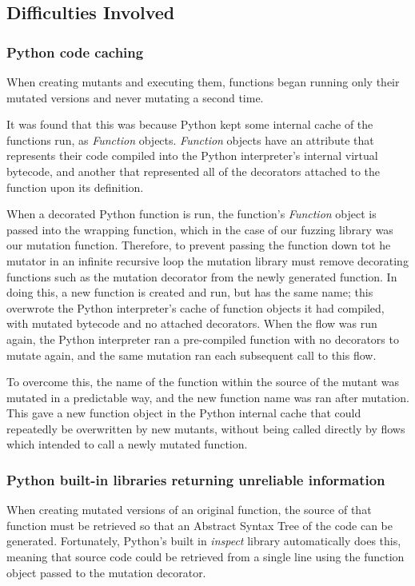 {\subsection{Difficulties Involved}
\subsubsection{Python code caching}
When creating mutants and executing them, functions began running only their mutated versions and never mutating a second time. \par

It was found that this was because Python kept some internal cache of the functions run, as \emph{Function} objects. \emph{Function} objects have an attribute that represents their code compiled into the Python interpreter's internal virtual bytecode, and another that represented all of the decorators attached to the function upon its definition. \par

When a decorated Python function is run, the function's \emph{Function} object is passed into the wrapping function, which in the case of our fuzzing library was our mutation function. Therefore, to prevent passing the function down tot he mutator in an infinite recursive loop the mutation library must remove decorating functions such as the mutation decorator from the newly generated function. In doing this, a new function is created and run, but has the same name; this overwrote the Python interpreter's cache of function objects it had compiled, with mutated bytecode and no attached decorators. When the flow was run again, the Python interpreter ran a pre-compiled function with no decorators to mutate again, and the same mutation ran each subsequent call to this flow. \par

To overcome this, the name of the function within the source of the mutant was mutated in a predictable way, and the new function name was ran after mutation. This gave a new function object in the Python internal cache that could repeatedly be overwritten by new mutants, without being called directly by flows which intended to call a newly mutated function. \par

\subsubsection{Python built-in libraries returning unreliable information}
When creating mutated versions of an original function, the source of that function must be retrieved so that an Abstract Syntax Tree of the code can be generated. Fortunately, Python's built in \emph{inspect} library automatically does this, meaning that source code could be retrieved from a single line using the function object passed to the mutation decorator. \par

}
